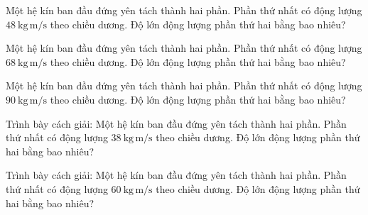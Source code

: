 \begin{ex}
Một hệ kín ban đầu đứng yên tách thành hai phần. Phần thứ nhất có động lượng $48\ \mathrm{kg\,m/s}$ theo chiều dương. Độ lớn động lượng phần thứ hai bằng bao nhiêu?
\end{ex}

\begin{ex}
Một hệ kín ban đầu đứng yên tách thành hai phần. Phần thứ nhất có động lượng $68\ \mathrm{kg\,m/s}$ theo chiều dương. Độ lớn động lượng phần thứ hai bằng bao nhiêu?
\end{ex}

\begin{ex}
Một hệ kín ban đầu đứng yên tách thành hai phần. Phần thứ nhất có động lượng $90\ \mathrm{kg\,m/s}$ theo chiều dương. Độ lớn động lượng phần thứ hai bằng bao nhiêu?
\end{ex}

\begin{bt}
Trình bày cách giải: Một hệ kín ban đầu đứng yên tách thành hai phần. Phần thứ nhất có động lượng $38\ \mathrm{kg\,m/s}$ theo chiều dương. Độ lớn động lượng phần thứ hai bằng bao nhiêu?
\end{bt}

\begin{bt}
Trình bày cách giải: Một hệ kín ban đầu đứng yên tách thành hai phần. Phần thứ nhất có động lượng $60\ \mathrm{kg\,m/s}$ theo chiều dương. Độ lớn động lượng phần thứ hai bằng bao nhiêu?
\end{bt}

